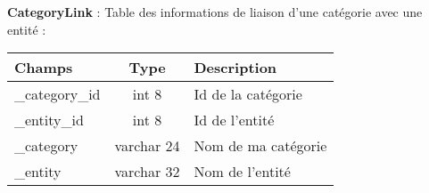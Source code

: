 \textbf{CategoryLink} : Table des informations de liaison d'une catégorie avec une entité :\\

\begin{tabular}{|p{3cm}|c|p{4cm}|}
\hline
\textbf{Champs} & \textbf{Type} & \textbf{Description}\\
\hline
\_category\_id & int 8 & Id de la catégorie\\
\hline
\_entity\_id & int 8 & Id de l'entité\\
\hline
\_category & varchar 24 & Nom de ma catégorie\\
\hline
\_entity & varchar 32 & Nom de l'entité\\
\hline
\end{tabular}
